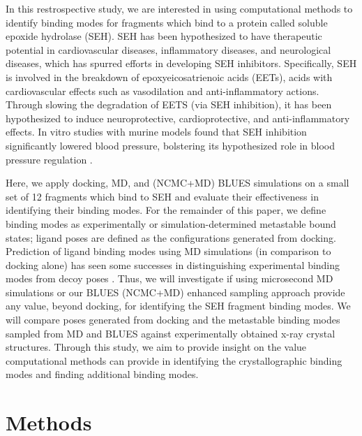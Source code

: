In this restrospective study, we are interested in using computational methods to identify binding modes for fragments which bind to a protein called soluble epoxide hydrolase (SEH).
SEH has been hypothesized to have therapeutic potential in cardiovascular diseases, inflammatory diseases, and neurological diseases, which has spurred efforts in developing SEH inhibitors.
Specifically, SEH is involved in the breakdown of epoxyeicosatrienoic acids (EETs), acids with cardiovascular effects such as vasodilation and anti-inflammatory actions.
Through slowing the degradation of EETS (via SEH inhibition), it has been hypothesized to induce neuroprotective, cardioprotective, and anti-inflammatory effects.
In vitro studies with murine models found that SEH inhibition significantly lowered blood pressure, bolstering its hypothesized role in blood pressure regulation \cite{morisseau_impact_2013,morisseau_epoxide_2005,kodani_2014_2015}.

Here, we apply docking, MD, and (NCMC+MD) BLUES simulations on a small set of 12 fragments which bind to SEH and evaluate their effectiveness in identifying their binding modes.
For the remainder of this paper, we define binding modes as experimentally or simulation-determined metastable bound states; ligand poses are defined as the configurations generated from docking.
Prediction of ligand binding modes using MD simulations (in comparison to docking alone) has seen some successes in distinguishing experimental binding modes from decoy poses \cite{liu_exploring_2017,clark_prediction_2016}.
Thus, we will investigate if using microsecond MD simulations or our BLUES  (NCMC+MD) enhanced sampling approach provide any value, beyond docking, for identifying the SEH fragment binding modes.
We will compare poses generated from docking and the metastable binding modes sampled from MD and BLUES against experimentally obtained x-ray crystal structures.
Through this study, we aim to provide insight on the value computational methods can provide in identifying the crystallographic binding modes and finding additional binding modes.

\section{Methods}
